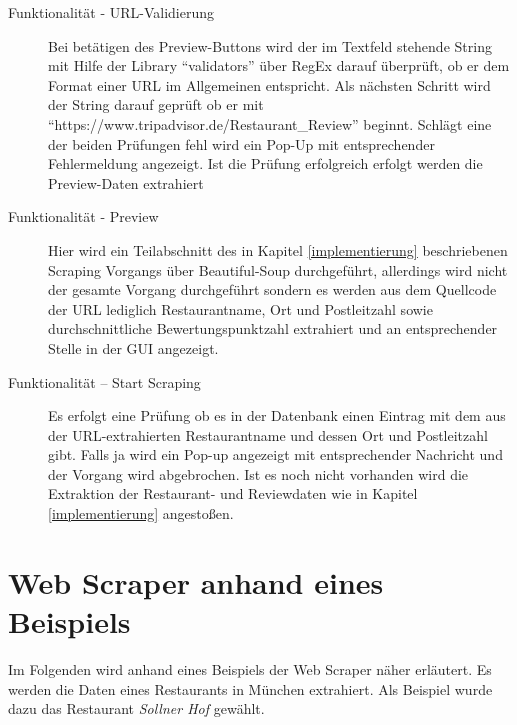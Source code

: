 \documentclass[a4paper,oneside,12pt]{report}
\begin{document}
            
            \begin{description}
            \item[Funktionalität - URL-Validierung] Bei betätigen des Preview-Buttons wird der im Textfeld stehende String mit Hilfe der Library ``validators'' über RegEx darauf überprüft, ob er dem Format einer URL im Allgemeinen entspricht. Als nächsten Schritt wird der String darauf geprüft ob er mit\\ ``https://www.tripadvisor.de/Restaurant\_Review'' beginnt. Schlägt eine der beiden Prüfungen fehl wird ein Pop-Up mit entsprechender Fehlermeldung angezeigt. Ist die Prüfung erfolgreich erfolgt werden die Preview-Daten extrahiert
            \item[Funktionalität - Preview] Hier wird ein Teilabschnitt des in Kapitel \ref{implementierung} beschriebenen Scraping Vorgangs über Beautiful-Soup durchgeführt, allerdings wird nicht der gesamte Vorgang durchgeführt sondern es werden aus dem Quellcode der URL lediglich Restaurantname, Ort und Postleitzahl sowie durchschnittliche Bewertungspunktzahl extrahiert und an entsprechender Stelle in der GUI angezeigt.
            \item[Funktionalität – Start Scraping]Es erfolgt eine Prüfung ob es in der Datenbank einen Eintrag mit dem aus der URL-extrahierten Restaurantname und dessen Ort und Postleitzahl gibt. Falls ja wird ein Pop-up angezeigt mit entsprechender Nachricht und der Vorgang wird abgebrochen. Ist es noch nicht vorhanden wird die Extraktion der Restaurant- und Reviewdaten wie in Kapitel \ref{implementierung} angestoßen.




            \end{description}
	
	\chapter[Web Scraper anhand eines Beispiels - Johanna Sickendiek]{Web Scraper anhand eines Beispiels}
	
		Im Folgenden wird anhand eines Beispiels der Web Scraper näher erläutert. Es werden die Daten eines Restaurants in München extrahiert. Als Beispiel wurde dazu das Restaurant \textit{Sollner Hof} gewählt.
	
\end{document}
